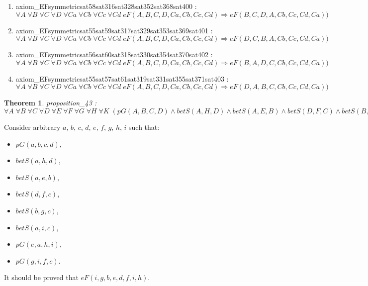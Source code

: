 \documentclass{article}
\newtheorem{theorem}{Theorem}
\begin{document}
\begin{enumerate}
\item axiom\_EFsymmetricsat58sat316sat328sat352sat368sat400 : $\forall A\;\forall B\;\forall C\;\forall D\;\forall Ca\;\forall Cb\;\forall Cc\;\forall Cd\;eF(A, B, C, D, Ca, Cb, Cc, Cd) \Rightarrow eF(B, C, D, A, Cb, Cc, Cd, Ca))$
\item axiom\_EFsymmetricsat55sat59sat317sat329sat353sat369sat401 : $\forall A\;\forall B\;\forall C\;\forall D\;\forall Ca\;\forall Cb\;\forall Cc\;\forall Cd\;eF(A, B, C, D, Ca, Cb, Cc, Cd) \Rightarrow eF(D, C, B, A, Cb, Cc, Cd, Ca))$
\item axiom\_EFsymmetricsat56sat60sat318sat330sat354sat370sat402 : $\forall A\;\forall B\;\forall C\;\forall D\;\forall Ca\;\forall Cb\;\forall Cc\;\forall Cd\;eF(A, B, C, D, Ca, Cb, Cc, Cd) \Rightarrow eF(B, A, D, C, Cb, Cc, Cd, Ca))$
\item axiom\_EFsymmetricsat55sat57sat61sat319sat331sat355sat371sat403 : $\forall A\;\forall B\;\forall C\;\forall D\;\forall Ca\;\forall Cb\;\forall Cc\;\forall Cd\;eF(A, B, C, D, Ca, Cb, Cc, Cd) \Rightarrow eF(D, A, B, C, Cb, Cc, Cd, Ca))$
\end{enumerate}

\hrulefill

\begin{theorem}
proposition\_43 : $\forall A \; \forall B \; \forall C \; \forall D \; \forall E \; \forall F \; \forall G \; \forall H \; \forall K \; ( pG(A, B, C, D)\wedge betS(A, H, D)\wedge betS(A, E, B)\wedge betS(D, F, C)\wedge betS(B, G, C)\wedge betS(A, K, C)\wedge pG(E, A, H, K)\wedge pG(G, K, F, C) \Rightarrow eF(K, G, B, E, D, F, K, H)\;)$
\end{theorem}

\setcounter{proofstepnum}{0}

\vspace{5pt}

\noindent Consider arbitrary $a$, $b$, $c$, $d$, $e$, $f$, $g$, $h$, $i$ such that: \begin{itemize} 

\item  $pG(a, b, c, d)$, 
\item  $betS(a, h, d)$, 
\item  $betS(a, e, b)$, 
\item  $betS(d, f, c)$, 
\item  $betS(b, g, c)$, 
\item  $betS(a, i, c)$, 
\item  $pG(e, a, h, i)$, 
\item  $pG(g, i, f, c)$. 
\end{itemize} 
It should be proved that $eF(i, g, b, e, d, f, i, h)$.
\vspace{5pt}
\end{document}

